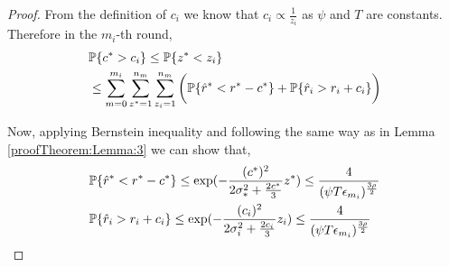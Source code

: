 \begin{proof}
From the definition of $c_i$ we know that $c_i\propto \frac{1}{z_i}$ as $\psi$ and $T$ are constants. Therefore in the $m_i$-th round,
\begin{align*}
&\mathbb{P}\lbrace c^{*} > c_i \rbrace
\leq  \mathbb{P}\lbrace  z^* < z_i  \rbrace \\
&\leq \sum_{m=0}^{m_i}\sum_{z^* =1}^{n_{m}}\sum_{z_i =1}^{n_{m}}\bigg(\mathbb{P}\lbrace \hat{r}^* < r^* - c^{*}\rbrace + \mathbb{P}\lbrace \hat{r}_i > r_i + c_i\rbrace\bigg)
\end{align*}

%

Now, applying Bernstein inequality and following the same way as in Lemma \ref{proofTheorem:Lemma:3} we can show that,
\begin{align*}
&\mathbb{P}\lbrace \hat{r}^* < r^* - c^{*}\rbrace \leq \exp(- \frac{(c^{*})^2}{2\sigma_*^2 + \frac{2 c^{*}}{3}} z^*)\leq \frac{4}{(\psi T\epsilon_{m_i})^{\frac{3\rho}{2}}} \\ 
&\mathbb{P}\lbrace \hat{r}_i > r_i + c_i\rbrace \leq \exp(- \frac{(c_{i})^2}{2\sigma_i^2 + \frac{2 c_{i}}{3}} z_i)\leq \frac{4}{(\psi T\epsilon_{m_i})^{\frac{3\rho}{2}}}
\end{align*}


\end{proof}
